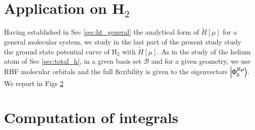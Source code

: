 \documentclass[aip,jcp,reprint,noshowkeys,superscriptaddress]{revtex4-1}
\newcommand{\phimub}[0]{\Phi^{\mathcal{B},\mu}_0}
\newcommand{\basis}[0]{\mathcal{B}}
\begin{document}
\section{Application on H$_2$}
Having established in Sec \ref{sec:ht_general} the analytical form of $ \tilde{H}[\mu]$ for a general molecular system, we study in the last part of the present study study the ground state potential curve of H$_2$ with $ \tilde{H}[\mu]$. 
As in the study of the helium atom of Sec \ref{sec:total_h}, in a given basis set $\basis$ and for a given geometry, we use RHF molecular orbitals and the full flexibility is given to the eigenvectors $\ket{\phimub}$. 
We report in Figs \ref{}


\section{Computation of integrals}
\end{document}
